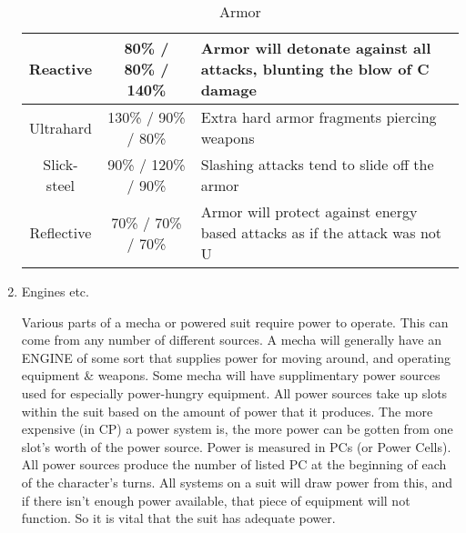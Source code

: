 \documentclass[twoside]{book}
\begin{document}
\begin{enumerate}
\begin{table}[!htb]
\begin{center}
\begin{tabular}{|c|c|p{2.5in}|}
\hline Reactive & 80\% / 80\% / 140\% & Armor will detonate against all attacks,
                         blunting the blow of C damage \\

\hline Ultrahard & 130\% / 90\% / 80\% & Extra hard armor fragments piercing
                         weapons \\

\hline Slick-steel & 90\% / 120\% / 90\% & Slashing attacks tend to slide off the
                         armor \\

\hline Reflective & 70\% / 70\% / 70\% &  Armor will protect against energy based
                         attacks as if the attack was not U \\

\hline
  \end{tabular}
  
\caption{Armor}
  
  \end{center}
\end{table}
    
              
  \item   
                Engines etc.  
                  
    {  
     Various parts of a mecha or powered suit
                   require power to operate. This can come from any
                   number of different sources. A mecha will generally
                   have an ENGINE of some sort that supplies power for
                   moving around, and operating equipment \& weapons.
                   Some mecha will have supplimentary power sources used
                   for especially power-hungry equipment. All power
                   sources take up slots within the suit based on the
                   amount of power that it produces. The more expensive
                   (in CP) a power system is, the more power can be
                   gotten from one slot's worth of the power
                   source. Power is measured in PCs (or Power Cells). All
                   power sources produce the number of listed PC at the
                   beginning of each of the character's turns. All
                   systems on a suit will draw power from this, and if
                   there isn't enough power available, that piece
                   of equipment will not function. So it is vital that
                   the suit has adequate power. 
    }
  
                
\begin{table}[!htb]
  \begin{center}


\end{center}
\end{table}
\end{enumerate}
\end{document}
